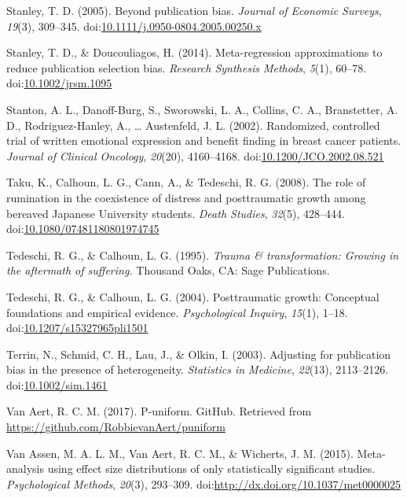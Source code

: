 \documentclass[english,man, mask]{apa6}
\theoremstyle{definition}
\theoremstyle{definition}
\theoremstyle{definition}
\theoremstyle{remark}
\begin{document}
\hypertarget{ref-Stanley2005}{}
Stanley, T. D. (2005). Beyond publication bias. \emph{Journal of
Economic Surveys}, \emph{19}(3), 309--345.
doi:\href{https://doi.org/10.1111/j.0950-0804.2005.00250.x}{10.1111/j.0950-0804.2005.00250.x}

\hypertarget{ref-Stanley2014}{}
Stanley, T. D., \& Doucouliagos, H. (2014). Meta-regression
approximations to reduce publication selection bias. \emph{Research
Synthesis Methods}, \emph{5}(1), 60--78.
doi:\href{https://doi.org/10.1002/jrsm.1095}{10.1002/jrsm.1095}

\hypertarget{ref-Stanton2002}{}
Stanton, A. L., Danoff-Burg, S., Sworowski, L. A., Collins, C. A.,
Branstetter, A. D., Rodriguez-Hanley, A., \ldots{} Austenfeld, J. L.
(2002). Randomized, controlled trial of written emotional expression and
benefit finding in breast cancer patients. \emph{Journal of Clinical
Oncology}, \emph{20}(20), 4160--4168.
doi:\href{https://doi.org/10.1200/JCO.2002.08.521}{10.1200/JCO.2002.08.521}

\hypertarget{ref-Taku2008}{}
Taku, K., Calhoun, L. G., Cann, A., \& Tedeschi, R. G. (2008). The role
of rumination in the coexistence of distress and posttraumatic growth
among bereaved Japanese University students. \emph{Death Studies},
\emph{32}(5), 428--444.
doi:\href{https://doi.org/10.1080/07481180801974745}{10.1080/07481180801974745}

\hypertarget{ref-Tedeschi1995}{}
Tedeschi, R. G., \& Calhoun, L. G. (1995). \emph{Trauma \&
transformation: Growing in the aftermath of suffering.} Thousand Oaks,
CA: Sage Publications.

\hypertarget{ref-Tedeschi2004}{}
Tedeschi, R. G., \& Calhoun, L. G. (2004). Posttraumatic growth:
Conceptual foundations and empirical evidence. \emph{Psychological
Inquiry}, \emph{15}(1), 1--18.
doi:\href{https://doi.org/10.1207/s15327965pli1501}{10.1207/s15327965pli1501}

\hypertarget{ref-Terrin2003}{}
Terrin, N., Schmid, C. H., Lau, J., \& Olkin, I. (2003). Adjusting for
publication bias in the presence of heterogeneity. \emph{Statistics in
Medicine}, \emph{22}(13), 2113--2126.
doi:\href{https://doi.org/10.1002/sim.1461}{10.1002/sim.1461}

\hypertarget{ref-VanAert2017}{}
Van Aert, R. C. M. (2017). P-uniform. GitHub. Retrieved from
\url{https://github.com/RobbievanAert/puniform}

\hypertarget{ref-VanAssen2015}{}
Van Assen, M. A. L. M., Van Aert, R. C. M., \& Wicherts, J. M. (2015).
Meta-analysis using effect size distributions of only statistically
significant studies. \emph{Psychological Methods}, \emph{20}(3),
293--309.
doi:\href{https://doi.org/http://dx.doi.org/10.1037/met0000025}{http://dx.doi.org/10.1037/met0000025}
\end{document}
